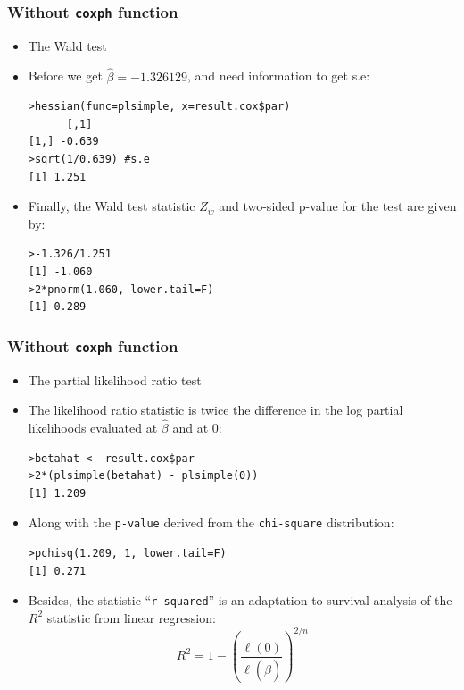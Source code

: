 \documentclass{beamer}
\begin{document}
\pagebreak
\begin{frame}[fragile]
\frametitle{Without \texttt{coxph} function}
\begin{itemize}
\item The Wald test
\item Before we get $\hat{\beta} = -1.326129$, and need information to get s.e:
\begin{Verbatim}
>hessian(func=plsimple, x=result.cox$par)
      [,1]
[1,] -0.639
>sqrt(1/0.639) #s.e
[1] 1.251
\end{Verbatim}
\item Finally, the Wald test statistic $Z_w$ and two-sided p-value for the test are given by:
\begin{Verbatim}
>-1.326/1.251
[1] -1.060
>2*pnorm(1.060, lower.tail=F) 
[1] 0.289
\end{Verbatim}
\end{itemize}
\end{frame}

\pagebreak
\begin{frame}[fragile]
\frametitle{Without \texttt{coxph} function}
\begin{itemize}
\item The partial likelihood ratio test
\item The likelihood ratio statistic is twice the difference in the log partial likelihoods evaluated at $\hat{\beta}$ and at 0:
\begin{Verbatim}
>betahat <- result.cox$par
>2*(plsimple(betahat) - plsimple(0))
[1] 1.209
\end{Verbatim}
\item Along with the \texttt{p-value} derived from the \texttt{chi-square} distribution:
\begin{Verbatim}
>pchisq(1.209, 1, lower.tail=F)
[1] 0.271
\end{Verbatim}
\item Besides, the statistic ``\texttt{r-squared}'' is an adaptation to survival analysis of the $R^2$ statistic from linear regression:
\begin{equation}
R^2 = 1 - (\frac{\ell(0)}{\ell(\hat{\beta})})^{2/n}  
\end{equation}
\end{itemize}
\end{frame}
\end{document}
